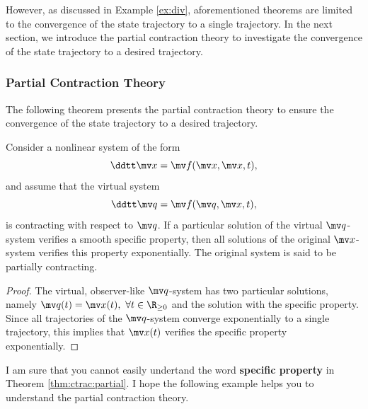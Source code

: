 \hfill

However, as discussed in Example \ref{ex:div}, aforementioned theorems are limited to the convergence of the state trajectory to a single trajectory.
In the next section, we introduce the partial contraction theory to investigate the convergence of the state trajectory to a desired trajectory.

\subsubsection{Partial Contraction Theory}

The following theorem presents the partial contraction theory to ensure the convergence of the state trajectory to a desired trajectory.

\begin{theorem}
    Consider a nonlinear system of the form 
    \begin{equation}
        \ddtt \bdx = \bdf(\bdx,\bdx,t)
        ,
    \end{equation}
    and assume that the virtual system
    \begin{equation}
        \ddtt\bdq = \bdf(\bdq,\bdx,t)
        ,
    \end{equation}
    is contracting with respect to $\bdq$.
    If a particular solution of the virtual $\bdq$-system verifies a smooth specific property, then all solutions of the original $\bdx$-system verifies this property exponentially.
    The original system is said to be partially contracting.
    \label{thm:ctrac:partial}
\end{theorem}

\begin{proof}
    The virtual, observer-like $\bdq$-system has two particular solutions, namely $\bdq(t) = \bdx(t),\ \forall t\in\R_{\ge0}$ and the solution with the speciﬁc property.
    Since all trajectories of the $\bdq$-system converge exponentially to a single trajectory, this implies that $\bdx(t)$ veriﬁes the speciﬁc property exponentially.
\end{proof}

I am sure that you cannot easily undertand the word \textbf{specific property} in Theorem \ref{thm:ctrac:partial}.
I hope the following example helps you to understand the partial contraction theory.

